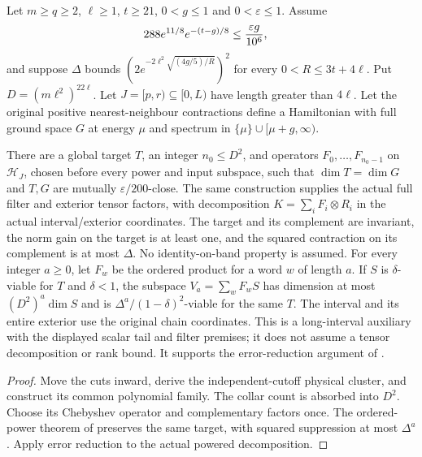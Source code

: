 \begin{lemma}
    \label{lem:independent_physical_dg_word_family}
    \leanok
    Let $m\ge q\ge2$, $\ell\ge1$, $t\ge21$, $0<g\le1$ and
    $0<\varepsilon\le1$. Assume
    \begin{align}
        288e^{11/8}e^{-(t-g)/8} & \le\frac{\varepsilon g}{10^6},\notag
    \end{align}
    and suppose $\Delta$ bounds
    $(2e^{-2\ell^2\sqrt{(4g/5)/R}})^2$ for every $0<R\le3t+4\ell$.
    Put $D=(m\ell^2)^{22\ell}$.
    Let $J=[p,r)\subseteq[0,L)$ have length greater than $4\ell$.
    Let the original positive nearest-neighbour contractions define a
    Hamiltonian with full ground space $G$ at energy $\mu$ and spectrum in
    $\{\mu\}\cup[\mu+g,\infty)$.

    There are a global target $T$, an integer $n_0\le D^2$, and operators
    $F_0,\ldots,F_{n_0-1}$ on $\mathcal H_J$, chosen before every power
    and input subspace, such that $\dim T=\dim G$ and $T,G$ are mutually
    $\varepsilon/200$-close.
    The same construction supplies the actual full filter and exterior
    tensor factors, with decomposition $K=\sum_iF_i\otimes R_i$ in the
    actual interval/exterior coordinates. The target and its complement
    are invariant, the norm gain on the target is at least one, and the
    squared contraction on its complement is at most $\Delta$. No
    identity-on-band property is assumed.
    For every integer $a\ge0$, let $F_w$ be the ordered product for a
    word $w$ of length $a$. If $S$ is $\delta$-viable for $T$ and
    $\delta<1$, the subspace $V_a=\sum_wF_wS$ has dimension at most
    $(D^2)^a\dim S$ and is $\Delta^a/(1-\delta)^2$-viable for the same $T$.
    The interval and its entire exterior use the original chain coordinates.
    This is a long-interval auxiliary with the displayed scalar tail and
    filter premises; it does not assume a tensor decomposition or rank bound.
    It supports the error-reduction argument of
    \cite[lines 597--622 and 1010--1024]{Arad2016RigorousRG}.
\end{lemma}
\begin{proof}\leanok
    Move the cuts inward, derive the independent-cutoff physical cluster,
    and construct its common polynomial family. The collar count is absorbed
    into $D^2$. Choose its Chebyshev operator and complementary factors once.
    The ordered-power theorem of
    \cite[``One polynomial family for every filter power'']{QICLean2026Blueprint}
    preserves the same target, with squared suppression at most $\Delta^a$.
    Apply error reduction to the actual powered decomposition.
\end{proof}
